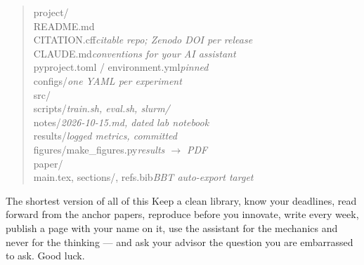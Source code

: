 \documentclass[11pt,a4paper]{article}
\begin{document}
\begin{quote}\small\ttfamily
project/\\
\hspace*{1em}README.md\\
\hspace*{1em}CITATION.cff\hfill \rmfamily\textit{citable repo; Zenodo DOI per release}\ttfamily\\
\hspace*{1em}CLAUDE.md\hfill \rmfamily\textit{conventions for your AI assistant}\ttfamily\\
\hspace*{1em}pyproject.toml / environment.yml\hfill \rmfamily\textit{pinned}\ttfamily\\
\hspace*{1em}configs/\hfill \rmfamily\textit{one YAML per experiment}\ttfamily\\
\hspace*{1em}src/\\
\hspace*{1em}scripts/\hfill \rmfamily\textit{train.sh, eval.sh, slurm/}\ttfamily\\
\hspace*{1em}notes/\hfill \rmfamily\textit{2026-10-15.md, dated lab notebook}\ttfamily\\
\hspace*{1em}results/\hfill \rmfamily\textit{logged metrics, committed}\ttfamily\\
\hspace*{1em}figures/make\_figures.py\hfill \rmfamily\textit{results $\rightarrow$ PDF}\ttfamily\\
\hspace*{1em}paper/\\
\hspace*{2em}main.tex, sections/, refs.bib\hfill \rmfamily\textit{BBT auto-export target}\ttfamily
\end{quote}

\vspace{0.6cm}
\begin{cbox}{The shortest version of all of this}
Keep a clean library, know your deadlines, read forward from the anchor papers,
reproduce before you innovate, write every week, publish a page with your name
on it, use the assistant for the mechanics and never for the thinking --- and
ask your advisor the question you are embarrassed to ask. Good luck.
\end{cbox}
\end{document}
